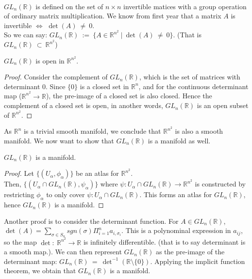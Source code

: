 \documentclass[12pt,twoside]{article}
\newcommand{\rn}{$\mathbb{R}^n$}
\begin{document}
\\
$GL_{n}(\mathbb{R})$ is defined on the set of $n\times n$ invertible matices with a group operation of ordinary matrix multiplication. We know from first year that a matrix $A$ is invertible $\Leftrightarrow$ $\det(A)\ \neq\ 0$.\\
So we can say: $GL_{n}(\mathbb{R})\ :=\ \{ A\in \mathbb{R}^{n^{2}}\ |\ \det(A)\ \neq\ 0\}$. (That is $GL_{n}(\mathbb{R})\ \subset\ \mathbb{R}^{n^{2}}$)
\begin{proposition}
$GL_{n}(\mathbb{R})$ is open in $\mathbb{R}^{n^{2}}$.
\begin{proof}
Consider the complement of $GL_{n}(\mathbb{R})$, which is the set of matrices with determinant 0. Since $\{0\}$ is a closed set in \rn, and for the continuous determinant map ($\mathbb{R}^{n^{2}}\rightarrow \mathbb{R}$), the pre-image of a closed set is also closed. Hence the complement of a closed set is open, in another words, $GL_{n}(\mathbb{R})$ is an open subset of $\mathbb{R}^{n^{2}}$.
\end{proof}
\end{proposition}
As $\mathbb{R}^{n}$ is a trivial smooth manifold, we conclude that $\mathbb{R}^{n^{2}}$ is also a smooth manifold. We now want to show that $GL_{n}(\mathbb{R})$ is a manifold as well.
\begin{proposition}
$GL_{n}(\mathbb{R})$ is a manifold.
\begin{proof}
Let $\{(U_{\alpha},\phi_{\alpha})\}$ be an atlas for $\mathbb{R}^{n^{2}}$.\\
Then, $\{(U_{\alpha} \cap GL_n(\mathbb{R}),\psi_{\alpha})\}$ where $\psi: U_{\alpha} \cap GL_{n}(\mathbb{R}) \rightarrow \mathbb{R}^{n^{2}}$ is constructed by restricting $\phi_{\alpha}$ to only cover $\psi: U_{\alpha} \cap GL_{n}(\mathbb{R})$. This forms an atlas for $GL_{n}(\mathbb{R})$, hence $GL_{n}(\mathbb{R})$ is a manifold.
\end{proof}
\end{proposition}
Another proof is to consider the determinant function. For $A\in GL_{n}(\mathbb{R})$, $\det(A) = \sum_{\sigma \in S_{n}} sgn(\sigma) \Pi_{i=1}^{n}a_{i,\sigma _{i}}$. This is a polynominal expression in $a_{ij}$, so the map $\det:\ \mathbb{R}^{n^{2}}\rightarrow \mathbb{R}$ is infinitely differentible. (that is to say determinant is a smooth map.). We can then represent $GL_{n}(\mathbb{R})$ as the pre-image of the determinant map: $GL_{n}(\mathbb{R})\ =\ \det^{-1}(\mathbb{R}\setminus\{0\})$. Applying the implicit function theorem, we obtain that $GL_{n}(\mathbb{R})$ is a manifold.\\
\end{document}
